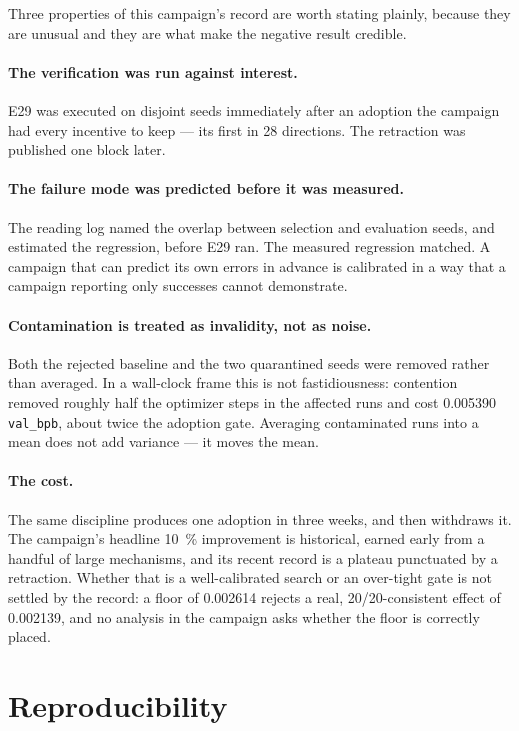 \documentclass[11pt,a4paper]{article}
\newcommand{\bpb}{\texttt{val\_bpb}}
\begin{document}
Three properties of this campaign's record are worth stating plainly, because they are
unusual and they are what make the negative result credible.

\paragraph{The verification was run against interest.} E29 was executed on disjoint seeds
immediately after an adoption the campaign had every incentive to keep --- its first in 28
directions. The retraction was published one block later.

\paragraph{The failure mode was predicted before it was measured.} The reading log named the
overlap between selection and evaluation seeds, and estimated the regression, before E29
ran. The measured regression matched. A campaign that can predict its own errors in advance
is calibrated in a way that a campaign reporting only successes cannot demonstrate.

\paragraph{Contamination is treated as invalidity, not as noise.} Both the rejected baseline
and the two quarantined seeds were removed rather than averaged. In a wall-clock frame this
is not fastidiousness: contention removed roughly half the optimizer steps in the affected
runs and cost \num{0.005390} \bpb{}, about twice the adoption gate. Averaging contaminated
runs into a mean does not add variance --- it moves the mean.

\paragraph{The cost.} The same discipline produces one adoption in three weeks, and then
withdraws it. The campaign's headline \SI{10}{\percent} improvement is historical, earned
early from a handful of large mechanisms, and its recent record is a plateau punctuated by a
retraction. Whether that is a well-calibrated search or an over-tight gate is not settled by
the record: a floor of \num{0.002614} rejects a real, 20/20-consistent effect of
\num{0.002139}, and no analysis in the campaign asks whether the floor is correctly placed.

\section{Reproducibility}
\end{document}

